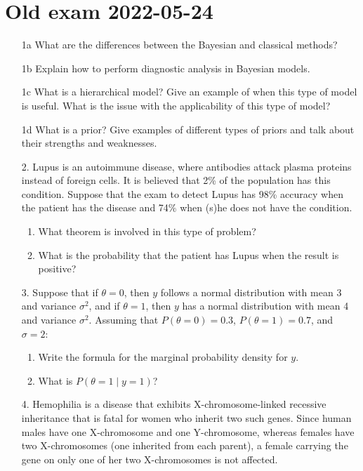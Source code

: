 \documentclass[12pt,a4paper,twoside]{article}
\begin{document}
\section{Old exam 2022-05-24}
\begin{enumerate}
    \item[1a] What are the differences between the Bayesian and classical methods?
    \item[1b] Explain how to perform diagnostic analysis in Bayesian models.
    \item[1c] What is a hierarchical model? Give an example of when this type of model is useful. What is the
    issue with the applicability of this type of model?
    \item[1d] What is a prior? Give examples of different types of priors and talk about their strengths and
    weaknesses.
    \item[2.] Lupus is an autoimmune disease, where antibodies attack plasma proteins instead of foreign cells.
    It is believed that 2\% of the population has this condition. Suppose that the exam to detect Lupus has 98\%
    accuracy when the patient has the disease and 74\% when (s)he does not have the condition.
    \begin{enumerate}[label=\textbf{2\alph*)}]
        \item What theorem is involved in this type of problem?
        \item What is the probability that the patient has Lupus when the result is positive?
    \end{enumerate}
    \item[3.] Suppose that if $\theta = 0$, then $y$ follows a normal distribution with mean 3 and variance $\sigma^2$,
    and if $\theta = 1$, then $y$ has a normal distribution with mean 4 and variance $\sigma^2$. Assuming that
    $P(\theta = 0) = 0.3$, $P(\theta = 1) = 0.7$, and $\sigma = 2$:
    \begin{enumerate}[label=\textbf{3\alph*)}]
        \item Write the formula for the marginal probability density for $y$.
        \item What is $P(\theta = 1 \mid y = 1)$?
    \end{enumerate}
    \item[4.] Hemophilia is a disease that exhibits X-chromosome-linked recessive inheritance that is fatal for women who
    inherit two such genes. Since human males have one X-chromosome and one Y-chromosome, whereas females have two X-chromosomes
    (one inherited from each parent), a female carrying the gene on only one of her two X-chromosomes is not affected.
    

\end{enumerate}
\end{document}
